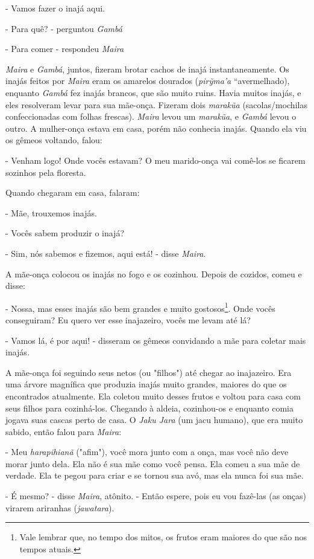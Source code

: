 - Vamos fazer o inajá aqui.

- Para quê? - perguntou \emph{Gambá}

- Para comer - respondeu \emph{Maira}

\emph{Maira} e \emph{Gambá}, juntos, fizeram brotar cachos de inajá
instantaneamente. Os inajás feitos por \emph{Maira} eram os amarelos
dourados (\emph{pirỹma'a} ``avermelhado), enquanto \emph{Gambá} fez
inajás brancos, que são muito ruins. Havia muitos inajás, e eles
resolveram levar para sua mãe-onça. Fizeram dois \emph{marakũa}
(sacolas/mochilas confeccionadas com folhas frescas). \emph{Maira} levou
um \emph{marakũa}, e \emph{Gambá} levou o outro. A mulher-onça estava em
casa, porém não conhecia inajás. Quando ela viu os gêmeos voltando,
falou:

- Venham logo! Onde vocês estavam? O meu marido-onça vai comê-los se
ficarem sozinhos pela floresta.

Quando chegaram em casa, falaram:

- Mãe, trouxemos inajás.

- Vocês sabem produzir o inajá?

- Sim, nós sabemos e fizemos, aqui está! - disse \emph{Maira}.

A mãe-onça colocou os inajás no fogo e os cozinhou. Depois de cozidos,
comeu e disse:

- Nossa, mas esses inajás são bem grandes e muito gostosos\footnote{Vale
  lembrar que, no tempo dos mitos, os frutos eram maiores do que são nos
  tempos atuais.}. Onde vocês conseguiram? Eu quero ver esse inajazeiro,
vocês me levam até lá?

- Vamos lá, é por aqui! - disseram os gêmeos convidando a mãe para
coletar mais inajás\emph{.}

A mãe-onça foi seguindo seus netos (ou "filhos") até chegar ao
inajazeiro. Era uma árvore magnífica que produzia inajás muito grandes,
maiores do que os encontrados atualmente. Ela coletou muito desses
frutos e voltou para casa com seus filhos para cozinhá-los. Chegando à
aldeia, cozinhou-os e enquanto comia jogava suas cascas perto de casa. O
\emph{Jaku Jara} (um jacu humano), que era muito sabido, então falou
para \emph{Maira}:

- Meu \emph{harapihianã} ("afim"), você mora junto com a onça, mas você
não deve morar junto dela. Ela não é sua mãe como você pensa. Ela comeu
a sua mãe de verdade. Ela te pegou para criar e se tornou sua avó, mas
ela nunca foi sua mãe.

- É mesmo? - disse \emph{Maira}, atônito. - Então espere, pois eu vou
fazê-las (as onças) virarem ariranhas (\emph{jawatara}).

